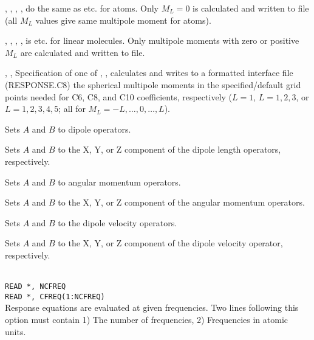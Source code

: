 \begin{description}

\item{, , }
, ,  do the same as  etc. for
atoms. Only $M_L=0$ is
calculated and written to file (all $M_L$ values give same multipole moment
for atoms).

\item{, , }
, ,  is  etc. for linear
molecules. Only
multipole moments with zero or positive $M_L$
are calculated and written to file.

\item{, , }
Specification of one of , , 
calculates and writes to a formatted interface file (RESPONSE.C8) the spherical multipole
moments in the specified/default grid points needed for C6, C8, and C10
coefficients, respectively ($L=1$, $L=1,2,3$, or $L=1,2,3,4,5$;
all for $M_L = -L,\ldots,0,\ldots,L$).

\item{}
Sets $A$ and $B$ to dipole operators.

\item{}
Sets $A$ and $B$ to the X, Y, or Z component of the dipole length operators, respectively.

\item{}
Sets $A$ and $B$ to angular momentum operators.

\item{}
Sets $A$ and $B$ to the X, Y, or Z component of the angular momentum operators.

\item{}
Sets $A$ and $B$ to the dipole velocity operators.

\item{}
Sets $A$ and $B$ to the X, Y, or Z component of the dipole velocity
operator, respectively.

\item{}\\
\verb|READ *, NCFREQ|\\
\verb|READ *, CFREQ(1:NCFREQ)|\\
Response equations are evaluated at given
frequencies. Two lines following
this option must contain 1) The number of frequencies, 2) Frequencies
in atomic units.


\end{description}
